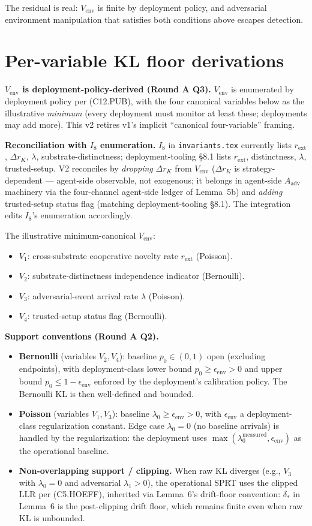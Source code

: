 \documentclass{article}
\newcommand{\Aadv}{A_{\mathrm{adv}}}
\newcommand{\rext}{r_{\mathrm{ext}}}
\newcommand{\deltastar}{\delta_{*}}
\newcommand{\Vem}{V_{\mathrm{env}}}
\newcommand{\eenv}{\epsilon_{\mathrm{env}}}
\begin{document}
The residual is real: $\Vem$ is finite by deployment policy, and
adversarial environment manipulation that satisfies both
conditions above escapes detection.

\section{Per-variable KL floor derivations}

\textbf{$\Vem$ is deployment-policy-derived (Round A Q3).}  $\Vem$
is enumerated by deployment policy per (C12.PUB), with the four
canonical variables below as the illustrative \emph{minimum}
(every deployment must monitor at least these; deployments may add
more).  This v2 retires v1's implicit ``canonical four-variable''
framing.

\textbf{Reconciliation with $I_8$ enumeration.}  $I_8$ in
\texttt{invariants.tex} currently lists $\rext$, $\Delta r_K$,
$\lambda$, substrate-distinctness; deployment-tooling §8.1 lists
$\rext$, distinctness, $\lambda$, trusted-setup.  V2 reconciles by
\emph{dropping} $\Delta r_K$ from $\Vem$ ($\Delta r_K$ is
strategy-dependent — agent-side observable, not exogenous; it
belongs in agent-side $\Aadv$ machinery via the four-channel
agent-side ledger of Lemma~5b) and \emph{adding} trusted-setup
status flag (matching deployment-tooling §8.1).  The integration
edits $I_8$'s enumeration accordingly.

The illustrative minimum-canonical $\Vem$:
\begin{itemize}
\item $V_1$: cross-substrate cooperative novelty rate $\rext$
  (Poisson).
\item $V_2$: substrate-distinctness independence indicator
  (Bernoulli).
\item $V_3$: adversarial-event arrival rate $\lambda$ (Poisson).
\item $V_4$: trusted-setup status flag (Bernoulli).
\end{itemize}

\textbf{Support conventions (Round A Q2).}
\begin{itemize}
\item \textbf{Bernoulli} (variables $V_2, V_4$): baseline
  $p_0 \in (0, 1)$ open (excluding endpoints), with deployment-class
  lower bound $p_0 \geq \eenv > 0$ and upper bound $p_0 \leq 1 -
  \eenv$ enforced by the deployment's calibration policy.  The
  Bernoulli KL is then well-defined and bounded.
\item \textbf{Poisson} (variables $V_1, V_3$): baseline
  $\lambda_0 \geq \eenv > 0$, with $\eenv$ a deployment-class
  regularization constant.  Edge case $\lambda_0 = 0$ (no baseline
  arrivals) is handled by the regularization: the deployment uses
  $\max(\lambda_0^{\mathrm{measured}}, \eenv)$ as the operational
  baseline.
\item \textbf{Non-overlapping support / clipping.}  When raw KL
  diverges (e.g., $V_3$ with $\lambda_0 = 0$ and adversarial
  $\lambda_1 > 0$), the operational SPRT uses the clipped LLR per
  (C5.HOEFF), inherited via Lemma~6's drift-floor convention:
  $\deltastar$ in Lemma~6 is the post-clipping drift floor, which
  remains finite even when raw KL is unbounded.
\end{itemize}
\end{document}
